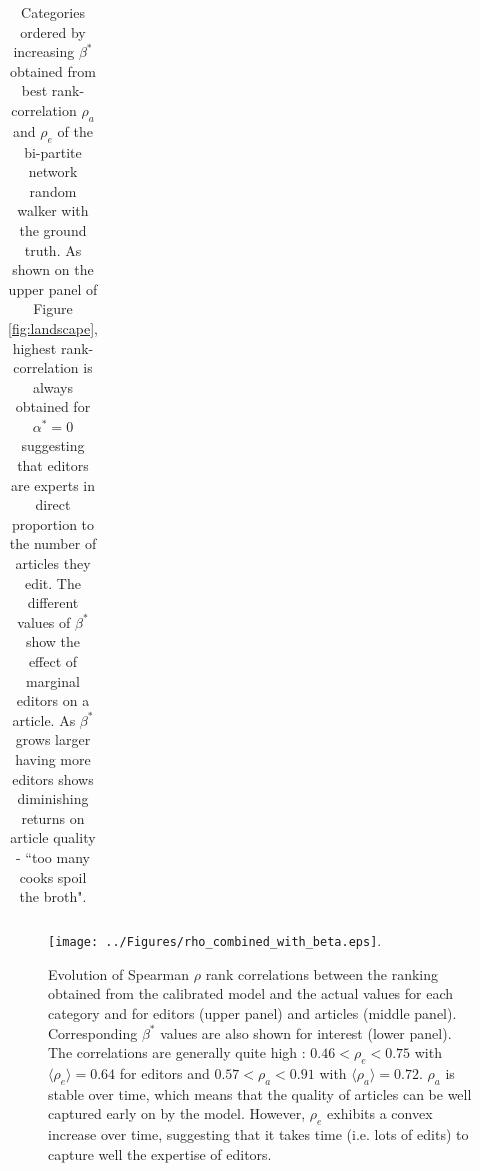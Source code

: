 \begin{table}
\begin{tabular}{|llcccc|}
\hline
\end{tabular}
\caption{Categories ordered by increasing $\beta^{*}$ obtained from best rank-correlation $\rho_a$ and  $\rho_e$
 of the {bi-partite network random walker} with the ground truth. As shown on the upper panel of Figure \ref{fig:landscape}, highest rank-correlation is always obtained for $\alpha^{*} = 0$ suggesting that editors are experts in direct proportion to the number of articles they edit. The different values of $\beta^{*}$ show the effect of marginal editors on a article. As $\beta^{*}$ grows larger having more editors shows diminishing returns on article quality - ``too many cooks spoil the broth".}
\label{tab:maxbeta}
\end{table}










\begin{figure}[!t]
\centering
\texttt{[image: ../Figures/rho\_combined\_with\_beta.eps]}.
\caption{Evolution of Spearman $\rho$ rank correlations between the ranking obtained from the calibrated model and the actual values for each category and for editors (upper panel)  and articles (middle panel). Corresponding $\beta^{*}$ values are also shown for interest (lower panel). The correlations are generally quite high : $ 0.46 < \rho_e < 0.75$ with $\langle \rho_e\rangle = 0.64$ for editors and $0.57 < \rho_a < 0.91$ with $\langle \rho_a\rangle = 0.72$. $\rho_{a}$  is stable over time, which means that the quality of articles can be well captured early on by the model. However, $\rho_e$ exhibits a convex increase over time, suggesting that it takes time (i.e. lots of edits) to capture well the expertise of editors.}
\label{fig:rhotime}


\end{figure}

	


